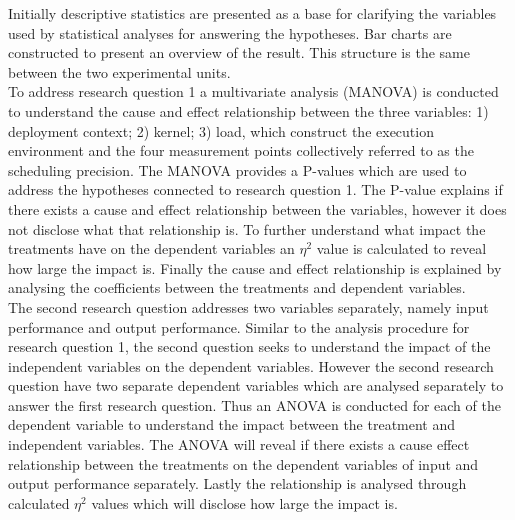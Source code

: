 Initially descriptive statistics are presented as a base for clarifying the variables used by statistical analyses for answering the hypotheses. Bar charts are constructed to present an overview of the result. This structure is the same between the two experimental units.\\

To address research question 1 a multivariate analysis (MANOVA) is conducted to understand the cause and effect relationship between the three variables: 1) deployment context; 2) kernel; 3) load, which construct the execution environment and the four measurement points collectively referred to as the scheduling precision. The MANOVA provides a P-values which are used to address the hypotheses connected to research question 1. The P-value explains if there exists a cause and effect relationship between the variables, however it does not disclose what that relationship is. To further understand what impact the treatments have on the dependent variables an $\eta^{2}$ value is calculated to reveal how large the impact is. Finally the cause and effect relationship is explained by analysing the coefficients between the treatments and dependent variables.\\

The second research question addresses two variables separately, namely input performance and output performance. Similar to the analysis procedure for research question 1, the second question seeks to understand the impact of the independent variables on the dependent variables. However the second research question have two separate dependent variables which are analysed separately to answer the first research question. Thus an ANOVA is conducted for each of the dependent variable to understand the impact between the treatment and independent variables. The ANOVA will reveal if there exists a cause effect relationship between the treatments on the dependent variables of input and output performance separately. Lastly the relationship is analysed through calculated $\eta^{2}$ values which will disclose how large the impact is.\\
